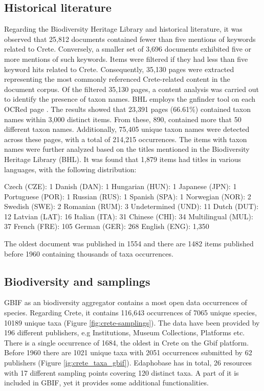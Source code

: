 \subsection{Historical literature}
Regarding the Biodiversity Heritage Library and historical literature, it was
observed that 25,812 documents contained fewer than five mentions of keywords related to Crete.
Conversely, a smaller set of 3,696 documents exhibited five or more mentions of such keywords.
Items were filtered if they had less than five keyword hits related to Crete.
Consequently, 35,130 pages were extracted representing the most commonly referenced Crete-related content in the document corpus.
Of the filtered 35,130 pages, a content analysis was carried out to identify the presence of taxon names.
BHL employs the gnfinder tool on each OCRed page \parencite{mozzherin_gnamesgnfinder_2022}.
The results showed that 23,391 pages (66.61\%) contained taxon names within 3,000 distinct items.
From these, 890, contained more that 50 different taxon names.
Additionally, 75,405 unique taxon names were detected across these pages, with a total of 214,215 occurrences.
The items with taxon names were further analyzed based on the titles mentioned
in the Biodiversity Heritage Library (BHL). It was found that 1,879 items had titles in various languages, with the following distribution:

Czech (CZE): 1
Danish (DAN): 1
Hungarian (HUN): 1
Japanese (JPN): 1
Portuguese (POR): 1
Russian (RUS): 1
Spanish (SPA): 1
Norwegian (NOR): 2
Swedish (SWE): 2
Romanian (RUM): 3
Undetermined (UND): 11
Dutch (DUT): 12
Latvian (LAT): 16
Italian (ITA): 31
Chinese (CHI): 34
Multilingual (MUL): 37
French (FRE): 105
German (GER): 268
English (ENG): 1,350

The oldest document was published in 1554 and there are 1482 items published before 1960 containing thousands of taxa occurrences.

\subsection{Biodiversity and samplings}

GBIF as an biodiversity aggregator contains a most open data occurrences of species. 
Regarding Crete, it contains 116,643 occurrences of 7065 unique species,
10189 unique taxa (Figure \ref{fig:crete-samplings}). The data
have been provided by 196 different publishers, e.g Institutions, Museum Collections, Platforms etc.
There is a single occurrence of 1684, the oldest in Crete on the Gbif platform. Before 
1960 there are 1021 unique taxa with 2051 occurrences submitted by 62 publishers (Figure \ref{ig:crete_taxa_gbif}).
Edaphobase has in total, 26 resources with 17 different sampling points covering 120 distinct taxa.
A part of it is included in GBIF, yet it provides some additional functionalities. 

